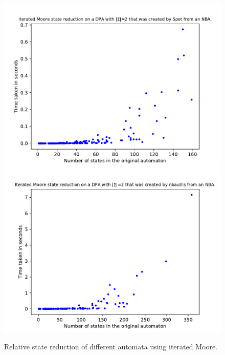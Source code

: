 \begin{figure}
\begin{minipage}{0.49\textwidth}
		\includegraphics[page=2,height=.3\textheight]{../data/analysis/iterated_moore/detspot_ap1.pdf} 
		\includegraphics[page=2,height=.3\textheight]{../data/analysis/iterated_moore/detnbaut_ap1.pdf} 
		\caption{Relative state reduction of different automata using iterated Moore.}
		\label{exp:fig:iterated_moore_reduct_abs}
	\end{minipage}
\end{figure}


